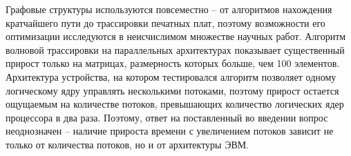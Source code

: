 Графовые структуры используются повсеместно -- от алгоритмов нахождения кратчайшего пути до трассировки печатных плат, поэтому возможности его оптимизации исследуются в неисчислимом множестве научных работ. Алгоритм волновой трассировки на параллельных архитектурах показывает существенный прирост только на матрицах, размерность которых больше, чем 100 элементов.
Архитектура устройства, на котором тестировался алгоритм позволяет одному логическому ядру управлять несколькими потоками, поэтому прирост остается ощущаемым на количестве потоков, превышающих количество логических ядер процессора в два раза. Поэтому, ответ на поставленный во введении вопрос неоднозначен -- наличие прироста времени с увеличением потоков зависит не только от количества потоков, но и от архитектуры ЭВМ. 
